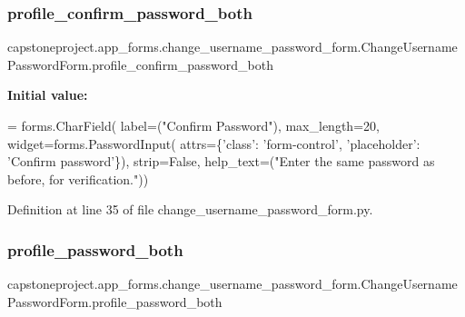 \subsubsection{\texorpdfstring{profile\+\_\+confirm\+\_\+password\+\_\+both}{profile\_confirm\_password\_both}}
{\footnotesize\ttfamily capstoneproject.\+app\+\_\+forms.\+change\+\_\+username\+\_\+password\+\_\+form.\+Change\+Username\+Password\+Form.\+profile\+\_\+confirm\+\_\+password\+\_\+both\hspace{0.3cm}{\ttfamily [static]}}

{\bfseries Initial value\+:}
\begin{DoxyCode}
=  forms.CharField(
        label=(\textcolor{stringliteral}{"Confirm Password"}),
        max\_length=20,
        widget=forms.PasswordInput(
            attrs=\{\textcolor{stringliteral}{'class'}: \textcolor{stringliteral}{'form-control'},
                   \textcolor{stringliteral}{'placeholder'}: \textcolor{stringliteral}{'Confirm password'}\}),
        strip=\textcolor{keyword}{False},
        help\_text=(\textcolor{stringliteral}{"Enter the same password as before, for verification."}))
\end{DoxyCode}


Definition at line 35 of file change\+\_\+username\+\_\+password\+\_\+form.\+py.

\mbox{\label{classcapstoneproject_1_1app__forms_1_1change__username__password__form_1_1_change_username_password_form_ac0513b8e1f55edfcc88f645f63f28225}} 
\subsubsection{\texorpdfstring{profile\+\_\+password\+\_\+both}{profile\_password\_both}}
{\footnotesize\ttfamily capstoneproject.\+app\+\_\+forms.\+change\+\_\+username\+\_\+password\+\_\+form.\+Change\+Username\+Password\+Form.\+profile\+\_\+password\+\_\+both\hspace{0.3cm}{\ttfamily [static]}}

